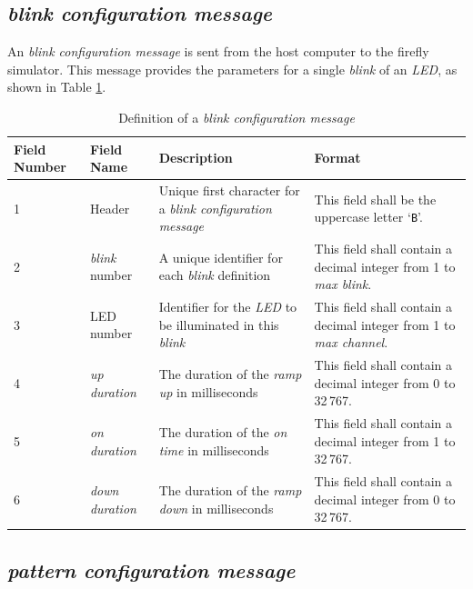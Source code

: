 \documentclass[letterpaper,11pt]{article}
\begin{document}
\subsection{\textit{blink configuration message}}

An \textit{blink configuration message} is sent from the host computer to the
firefly simulator. This message provides the parameters for a single
\textit{blink} of an \textit{LED}, as shown in Table \ref{tab:BlinkConfig}.

\begin{table}[H]
\centering
\caption{Definition of a \textit{blink configuration message}}
\label{tab:BlinkConfig}
\setlength\extrarowheight{2pt}
\begin{tabular}[h]{|p{0.5in}|p{1.00in}|p{2.25in}|p{2.25in}|} \hline
Field Number & Field Name & Description & Format \\ \hline
1            & Header
             & Unique first character for a \textit{blink configuration message}
             & This field shall be the uppercase letter `\texttt{B}'.
             \\ \hline
2            & \textit{blink} number
             & A unique identifier for each \textit{blink} definition
             & This field shall contain a decimal integer from 1 to
             \textit{max blink}.
             \\ \hline
3            & LED number
             & Identifier for the \textit{LED} to be illuminated in this
             \textit{blink}
             & This field shall contain a decimal integer from 1 to
             \textit{max channel}.
             \\ \hline
4            & \textit{up duration}
             & The duration of the \textit{ramp up} in milliseconds
             & This field shall contain a decimal integer from 0 to 32\,767.
             \\ \hline
5            & \textit{on duration}
             & The duration of the \textit{on time} in milliseconds
             & This field shall contain a decimal integer from 1 to 32\,767.
             \\ \hline
6            & \textit{down duration}
             & The duration of the \textit{ramp down} in milliseconds
             & This field shall contain a decimal integer from 0 to 32\,767.
             \\ \hline
\end{tabular}
\end{table}

\subsection{\textit{pattern configuration message}}
\end{document}
